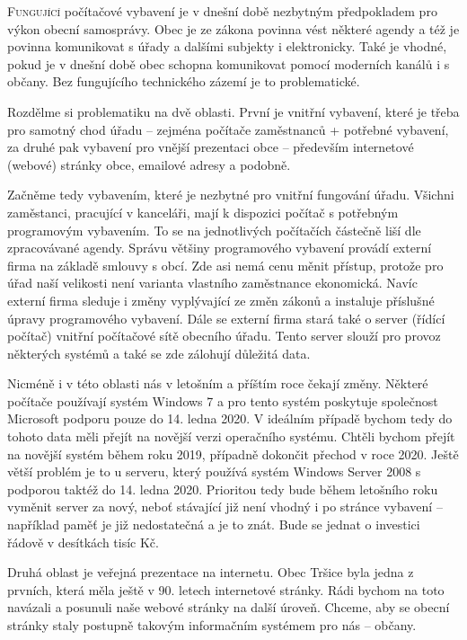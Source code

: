 \documentclass[10pt]{article}
\begin{document}
\begin{multicols}{3}{


\lettrine{F}{ungující} počítačové vybavení je v dnešní době nezbytným předpokladem pro výkon obecní samosprávy. Obec je ze zákona povinna vést některé agendy a též je povinna komunikovat s úřady a dalšími subjekty i elektronicky. Také je vhodné, pokud je v dnešní době obec schopna komunikovat pomocí moderních kanálů i s občany. Bez fungujícího technického zázemí je to problematické.

Rozdělme si problematiku na dvě oblasti. První je vnitřní vybavení, které je třeba pro samotný chod úřadu – zejména počítače zaměstnanců + potřebné vybavení, za druhé pak vybavení pro vnější prezentaci obce – především internetové (webové) stránky obce, emailové adresy a podobně.

Začněme tedy vybavením, které je nezbytné pro vnitřní fungování úřadu. Všichni zaměstanci, pracující v kanceláři, mají k dispozici počítač s potřebným programovým vybavením. To se na jednotlivých počítačích částečně liší dle zpracovávané agendy. Správu většiny programového vybavení provádí externí firma na základě smlouvy s obcí. Zde asi nemá cenu měnit přístup, protože pro úřad naší velikosti není varianta vlastního zaměstnance ekonomická. Navíc externí firma sleduje i změny vyplývající ze změn zákonů a instaluje příslušné úpravy programového vybavení. Dále se externí firma stará také o server (řídící počítač) vnitřní počítačové sítě obecního úřadu. Tento server slouží pro provoz některých systémů a také se zde zálohují důležitá data.

Nicméně i v této oblasti nás v letošním a příštím roce čekají změny. Některé počítače používají systém Windows 7 a pro tento systém poskytuje společnost Microsoft podporu pouze do 14. ledna 2020. V ideálním případě bychom tedy do tohoto data měli přejít na novější verzi operačního systému. Chtěli bychom přejít na novější systém během roku 2019, případně dokončit přechod v roce 2020. Ještě větší problém je to u serveru, který používá systém Windows Server 2008 s podporou taktéž do 14. ledna 2020. Prioritou tedy bude během letošního roku vyměnit server za nový, neboť stávající již není vhodný i po stránce vybavení – například paměť je již nedostatečná a je to znát. Bude se jednat o investici řádově v desítkách tisíc Kč.

Druhá oblast je veřejná prezentace na internetu. Obec Tršice byla jedna z prvních, která měla ještě v 90. letech internetové stránky. Rádi bychom na toto navázali a posunuli naše webové stránky na další úroveň. Chceme, aby se obecní stránky staly postupně takovým informačním systémem pro nás – občany.

}
\end{multicols}
\end{document}
